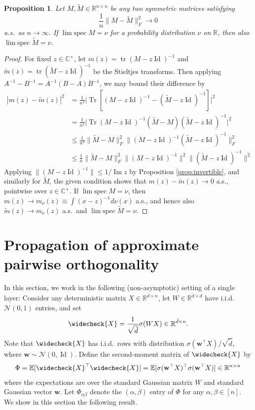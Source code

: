 \documentclass{article}
\newtheorem{proposition}[theorem]{Proposition}
\theoremstyle{definition}
\newcommand{\R}{\mathbb{R}}
\newcommand{\C}{\mathbb{C}}
\newcommand{\N}{\mathcal{N}}
\newcommand{\E}{\mathbb{E}}
\newcommand{\Id}{\operatorname{Id}}
\newcommand{\Tr}{\operatorname{Tr}}
\newcommand{\tr}{\operatorname{tr}}
\newcommand{\w}{\mathbf{w}}
\renewcommand{\a}{\alpha}
\renewcommand{\b}{\beta}
\newcommand{\vd}{\check{d}}
\newcommand{\wM}{\widetilde{M}}
\newcommand{\vX}{\widecheck{X}}
\newcommand{\1}{\mathbf{1}}
\newcommand{\limspec}{\operatorname{lim\;spec}}
\renewcommand{\Im}{\operatorname{Im}}
\begin{document}
\begin{proposition}\label{prop:specapprox}
Let $M,\wM \in \R^{n \times n}$ be any two symmetric matrices satisfying
\[\frac{1}{n}\|M-\wM\|_F^2 \to 0\]
a.s.\ as $n \to \infty$. If $\limspec M=\nu$ for a probability
distribution $\nu$ on $\R$, then also $\limspec \wM=\nu$.
\end{proposition}
\begin{proof}
For fixed $z \in \C^+$, let
$m(z)=\tr(M-z\Id)^{-1}$ and $\tilde{m}(z)=\tr(\wM-z\Id)^{-1}$
be the Stieltjes transforms. Then applying $A^{-1}-B^{-1}=A^{-1}(B-A)B^{-1}$,
we may bound their difference by
\begin{align*}
|m(z)-\tilde{m}(z)|^2&=\frac{1}{n^2}\Big|\Tr
[(M-z\Id)^{-1}-(\wM-z\Id)^{-1}]\Big|^2\\
&=\frac{1}{n^2}\Big|\Tr (M-z\Id)^{-1}(\wM-M)(\wM-z\Id)^{-1}\Big|^2\\
&\leq \frac{1}{n^2}\|\wM-M\|_F^2\|(M-z\Id)^{-1}(\wM-z\Id)^{-1}\|_F^2\\
&\leq \frac{1}{n}\|\wM-M\|_F^2\|(M-z\Id)^{-1}\|^2\|(\wM-z\Id)^{-1}\|^2
\end{align*}
Applying $\|(M-z\Id)^{-1}\| \leq 1/\Im z$ by Proposition \ref{prop:invertible},
and similarly for $\wM$, the given
condition shows that $m(z)-\tilde{m}(z) \to 0$ a.s., pointwise over $z \in
\C^+$. If $\limspec
M=\nu$, then $m(z) \to m_\nu(z) \equiv \int (x-z)^{-1}d\nu(x)$ a.s., and hence
also $\tilde{m}(z) \to m_\nu(z)$ a.s.\ and $\limspec \wM=\nu$.
\end{proof}

\section{Propagation of approximate pairwise
orthogonality}\label{appendix:orthogonal}

In this section, we work in the following (non-asymptotic) setting of a single
layer: Consider any deterministic matrix $X \in \R^{d \times n}$,
let $W \in \R^{\vd \times d}$ have i.i.d.\ $\N(0,1)$ entries, and set
\begin{equation}\label{def:vX}
\vX=\frac{1}{\sqrt{\vd}}\sigma(WX) \in \R^{\vd \times n}.
\end{equation}
Note that $\vX$ has i.i.d.\ rows with distribution $\sigma(\w^\top
X)/\sqrt{\vd}$, where $\w \sim \N(0,\Id)$. Define the second-moment matrix of
$\vX$ by
\begin{equation}\label{def:Phi}
\Phi=\E[\vX^\top \vX]
=\E[\sigma(\w^\top X)^\top \sigma(\w^\top X)] \in \R^{n \times n}
\end{equation}
where the expectations are over the standard Gaussian matrix $W$ and standard
Gaussian vector $\w$. Let $\Phi_{\a\b}$ denote the $(\a,\b)$ entry of $\Phi$ for any $\a,\b\in[n]$. We show in this section the following result.
\end{document}

